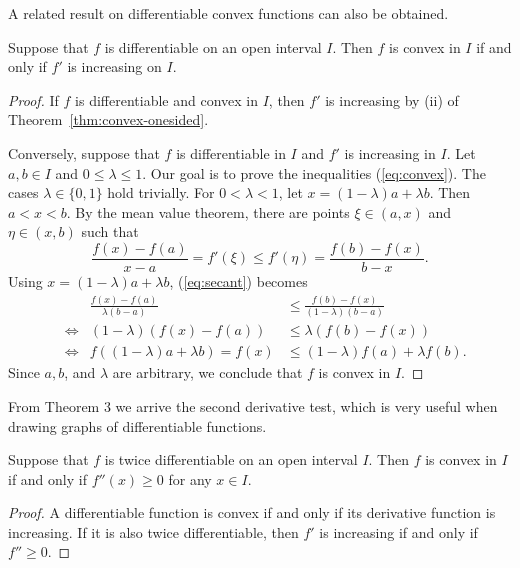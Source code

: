 A related result on differentiable convex functions can also be obtained.
\begin{thm}
  Suppose that $f$ is differentiable on an open interval $I$.
  Then $f$ is convex in $I$ if and only if $f'$ is increasing on $I$.
\end{thm}

\begin{proof}
  If $f$ is differentiable and convex in $I$, then $f'$ is increasing by (ii) of Theorem~\ref{thm:convex-onesided}.

  Conversely, suppose that $f$ is differentiable in $I$ and $f'$ is increasing in $I$.  Let $a, b \in I$ and $0 \leqslant \lambda \leqslant 1$.  Our goal is to prove the inequalities (\ref{eq:convex}).
  The cases $\lambda \in \{ 0, 1 \}$ hold trivially.
  For $0 < \lambda < 1$, let $x = (1 - \lambda) a + \lambda b$.
  Then $a < x < b$.
  By the mean value theorem, there are points $\xi \in (a,x)$ and $\eta \in (x,b)$ such that
  \begin{equation}
    \label{eq:secant}
    \frac{ f(x) - f(a) }{ x - a } = f'(\xi) \leqslant f'(\eta) = \frac{ f(b) - f(x) }{ b - x }.
  \end{equation}
  Using $x = (1 - \lambda) a + \lambda b$, (\ref{eq:secant}) becomes
  \begin{align*}
    & & \frac{ f(x) - f(a) }{ \lambda (b-a) } &\leqslant \frac{ f(b) - f(x) }{ (1 - \lambda) (b-a) } \\
    & \iff & (1 - \lambda) (f(x) - f(a)) &\leqslant \lambda (f(b) - f(x)) \\
    &  \iff & f( (1-\lambda)a + \lambda b ) = f(x) & \leqslant (1-\lambda) f(a) + \lambda f(b).
  \end{align*}
  Since $a, b$, and $\lambda$ are arbitrary, we conclude that $f$ is convex in $I$.
\end{proof}

From Theorem 3 we arrive the second derivative test, which is very useful when drawing graphs of differentiable functions.

\begin{cor}
  Suppose that $f$ is twice differentiable on an open interval $I$.
  Then $f$ is convex in $I$ if and only if $f''(x) \geqslant 0$ for any $x \in I$.
\end{cor}

\begin{proof}
  A differentiable function is convex if and only if its derivative function is increasing.
  If it is also twice differentiable, then $f'$ is increasing if and only if $f'' \geqslant 0$.
\end{proof}

